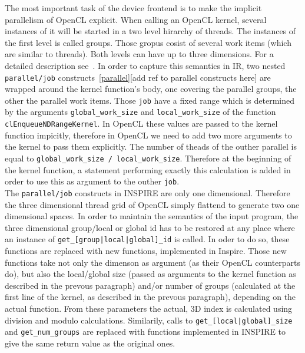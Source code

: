 The most important task of the device frontend is to make the implicit parallelism of OpenCL explicit. When calling an OpenCL kernel, several instances of it will be started in a two level hirarchy of threads. The instances of the first level is called groups. Those gropus cosist of several work items (which are similar to threads). Both levels can have up to three dimensions. For a detailed description see~\cite{oclRef}. In order to capture this semantics in IR, two nested \texttt{parallel/job} constructs~\ref{parallel}[add ref to parallel constructs here] are wrapped around the kernel function's body, one covering the parallel groups, the other the parallel work items. Those \texttt{job} have a fixed range which is determined by the arguments \texttt{global\_work\_size} and \texttt{local\_work\_size} of the function \texttt{clEnqueueNDRangeKernel}. In OpenCL these values are passed to the kernel function impicitly, therefore in OpenCL we need to add two more arguments to the kernel to pass them explicitly. The number of theads of the outher parallel is equal to \texttt{global\_work\_size / local\_work\_size}. Therefore at the beginning of the kernel function, a statement performing exactly this calculation is added in order to use this as argument to the outher \texttt{job}. \\

The \texttt{parallel/job} constructs in INSPIRE are only one dimensional. Therefore the three dimensional thread grid of OpenCL simply flattend to generate two one dimensional spaces. In order to maintain the semantics of the input program, the three dimensional group/local or global id has to be restored at any place where an instance of \texttt{get\_[group|local|global]\_id} is called. In oder to do so, these functions are replaced with new functions, implemented in Inspire. Those new functions take not only the dimenson as argument (as their OpenCL counterparts do), but also the local/global size (passed as arguments to the kernel function as described in the prevous paragraph) and/or number of groups (calculated at the first line of the kernel, as described in the prevous paragraph), depending on the actual function. From these parameters the actual, 3D index is calculated using division and modulo calculations. Similarily, calls to \texttt{get\_[local|global]\_size} and \texttt{get\_num\_groups} are replaced with functions implemented in INSPIRE to give the same return value as the original ones.

